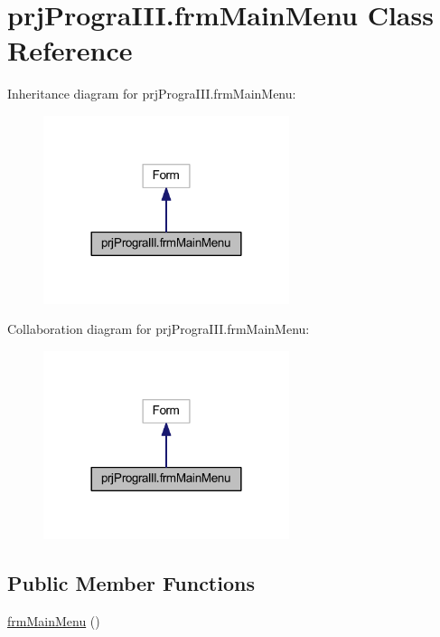 \hypertarget{classprj_progra_i_i_i_1_1frm_main_menu}{}\section{prj\+Progra\+I\+I\+I.\+frm\+Main\+Menu Class Reference}
\label{classprj_progra_i_i_i_1_1frm_main_menu}


Inheritance diagram for prj\+Progra\+I\+I\+I.\+frm\+Main\+Menu\+:
\nopagebreak
\begin{figure}[H]
\begin{center}
\leavevmode
\includegraphics[width=204pt]{classprj_progra_i_i_i_1_1frm_main_menu__inherit__graph}
\end{center}
\end{figure}


Collaboration diagram for prj\+Progra\+I\+I\+I.\+frm\+Main\+Menu\+:
\nopagebreak
\begin{figure}[H]
\begin{center}
\leavevmode
\includegraphics[width=204pt]{classprj_progra_i_i_i_1_1frm_main_menu__coll__graph}
\end{center}
\end{figure}
\subsection*{Public Member Functions}
\begin{DoxyCompactItemize}
\item 
\hyperlink{classprj_progra_i_i_i_1_1frm_main_menu_a15c06a0d87b65240b58db4d78c6b54cb}{frm\+Main\+Menu} ()
\end{DoxyCompactItemize}
